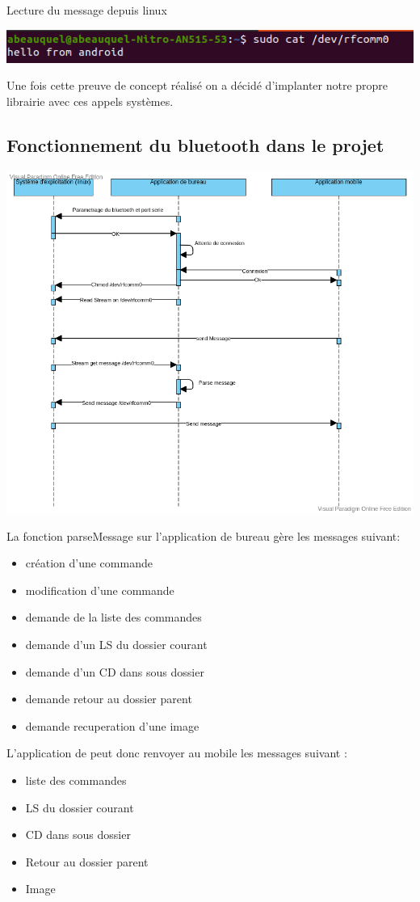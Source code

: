 \documentclass[12pt,fleqn]{article}
\begin{document}
Lecture du message depuis linux

\includegraphics[scale=0.7]{images/rfcomm_linux_message.png}

Une fois cette preuve de concept réalisé on a décidé d'implanter notre propre librairie avec ces appels systèmes. 
\subsection{Fonctionnement du bluetooth dans le projet}
\includegraphics[scale=0.5]{images/sequence_bluetooth.png}

La fonction parseMessage sur l'application de bureau gère les messages suivant:
\begin{itemize}
\item création d'une commande
\item modification d'une commande
\item demande de la liste des commandes
\item demande d'un LS du dossier courant
\item demande d'un CD dans sous dossier
\item demande retour au dossier parent
\item demande recuperation d'une image
\end{itemize}
L'application de peut donc renvoyer au mobile les messages suivant :
\begin{itemize}
\item liste des commandes
\item LS du dossier courant
\item CD dans sous dossier
\item Retour au dossier parent
\item Image
\end{itemize}
\end{document}
